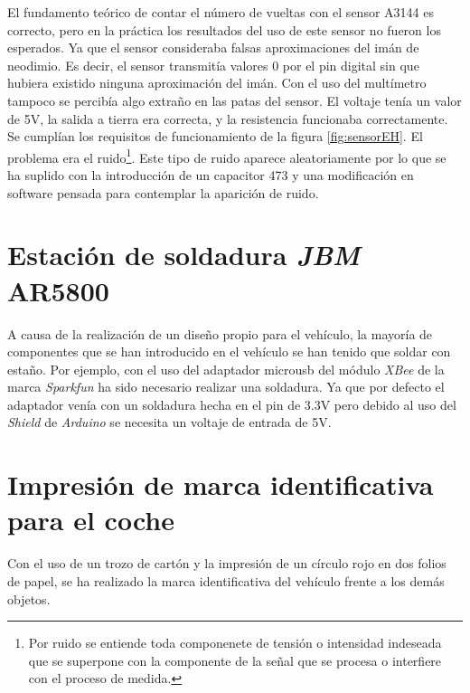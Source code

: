 El fundamento teórico de contar el número de vueltas con el sensor A3144 es correcto, pero en la práctica los resultados del uso de este sensor no fueron los esperados. Ya que el sensor consideraba falsas aproximaciones del imán de neodimio. Es decir, el sensor transmitía valores 0 por el pin digital sin que hubiera existido ninguna aproximación del imán. Con el uso del multímetro tampoco se percibía algo extraño en las patas del sensor. El voltaje tenía un valor de 5V, la salida a tierra era correcta, y la resistencia funcionaba correctamente. Se cumplían los requisitos de funcionamiento de la figura \ref{fig:sensorEH}. El problema era el ruido\footnote{Por ruido se entiende toda componenete de tensión o intensidad indeseada que se superpone con la componente de la señal que se procesa o interfiere con el proceso de medida.}. Este tipo de ruido aparece aleatoriamente por lo que se ha suplido con la introducción de un capacitor 473 y una modificación en software pensada para contemplar la aparición de ruido.

\section{Estación de soldadura \emph{JBM} AR5800}

A causa de la realización de un diseño propio para el vehículo, la mayoría de componentes que se han introducido en el vehículo se han tenido que soldar con estaño. Por ejemplo, con el uso del adaptador microusb del módulo \emph{XBee} de la marca \emph{Sparkfun} ha sido necesario realizar una soldadura. Ya que por defecto el adaptador venía con un soldadura hecha en el pin de 3.3V pero debido al uso del \textit{Shield} de \emph{Arduino} se necesita un voltaje de entrada de 5V.

\section{Impresión de marca identificativa para el coche}

Con el uso de un trozo de cartón y la impresión de un círculo rojo en dos folios de papel, se ha realizado la marca identificativa del vehículo frente a los demás objetos.